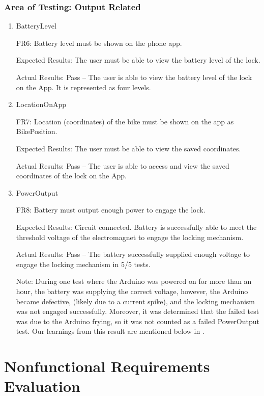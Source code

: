 \documentclass[12pt, titlepage]{article}
\begin{document}
\subsubsection{Area of Testing: Output Related}

\begin{enumerate}

\item{BatteryLevel

FR6: Battery level must be shown on the phone app. }

Expected Results: The user must be able to view the battery level of the lock.

Actual Results: Pass -- The user is able to view the battery level of the lock on the App. It is represented as four levels. 

\item{LocationOnApp

FR7: Location (coordinates) of the bike must be shown on the app as BikePosition.}

Expected Results: The user must be able to view the saved coordinates.

Actual Results: Pass -- The user is able to access and view the saved coordinates of the lock on the App.

\item{PowerOutput

FR8: Battery must output enough power to engage the lock. } \label{PowerOutput}

Expected Results: Circuit connected. Battery is successfully able to meet the threshold voltage of the electromagnet to engage the locking mechanism.  

Actual Results: Pass -- The battery successfully supplied enough voltage to engage the locking mechanism in 5/5 tests. 

Note: During one test where the Arduino was powered on for more than an hour, the battery was supplying the correct voltage, however, the Arduino became defective, (likely due to a current spike), and the locking mechanism was not engaged successfully. Moreover, it was determined that the failed test was due to the Arduino frying, so it was not counted as a failed PowerOutput test. Our learnings from this result are mentioned below in . 

\end{enumerate}

\section{Nonfunctional Requirements Evaluation}
\end{document}
